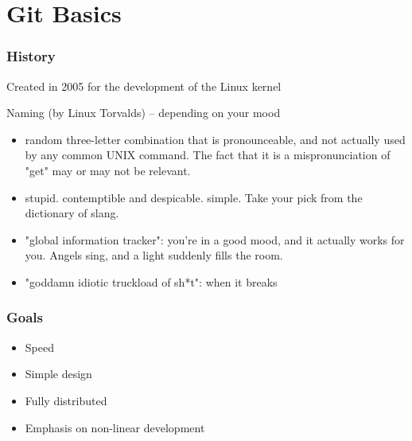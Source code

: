 \documentclass{beamer}
\begin{document}
\section[Git Basics]{Git Basics}
\begin{frame}
  \frametitle{History}
  Created in 2005 for the development of the Linux kernel

  Naming (by Linux Torvalds) -- depending on your mood
  \begin{itemize}
    \item random three-letter combination that is pronounceable, and not
      actually used by any common UNIX command.  The fact that it is a
      mispronunciation of "get" may or may not be relevant.
    \item stupid. contemptible and despicable. simple. Take your pick from the
      dictionary of slang.
    \item "global information tracker": you're in a good mood, and it actually
      works for you. Angels sing, and a light suddenly fills the room.
    \item "goddamn idiotic truckload of sh*t": when it breaks
  \end{itemize}
\end{frame}

\begin{frame}
  \frametitle{Goals}
  \begin{itemize}
    \item Speed
    \item Simple design
    \item Fully distributed
    \item Emphasis on non-linear development
  \end{itemize}
\end{frame}
\end{document}
